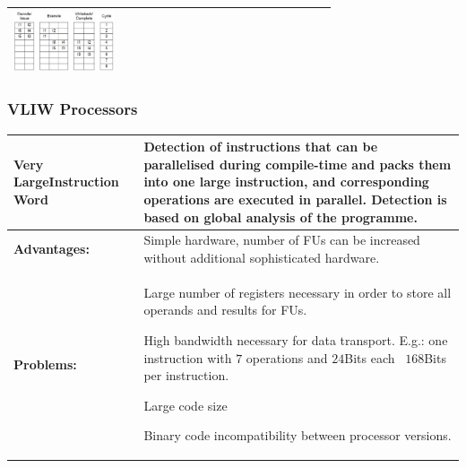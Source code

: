 \begin{longtable}{|>{\bfseries}p{}|p{}|p{}|}
						\includegraphics[width=0.35\textwidth]{./pictures/policyOutOfOrderOutOfOrder.png}\\
				\hline
			\end{longtable}
			
		\subsubsection{VLIW Processors}
			\begin{longtable}{|>{\bfseries}p{}|p{}|}
				\hline
				Very Large\newline Instruction Word
					& Detection of instructions that can be parallelised during compile-time and packs them into one large instruction, and corresponding operations are executed in parallel. Detection is based on global analysis of the programme.\\
				\hline
				Advantages:
					& Simple hardware, number of FUs can be increased without additional sophisticated hardware.\\
				\hline
				Problems:
					& \begin{compactitem}
					    \item Large number of registers necessary in order to store all operands and results for FUs.
					    \item High bandwidth necessary for data transport.
					    	E.g.: one instruction with $7$ operations and $24$Bits each \textrightarrow\ $168$Bits per instruction.
					    \item Large code size
					    \item Binary code incompatibility between processor versions.
					\end{compactitem}\\
				\hline
			\end{longtable}			
			
